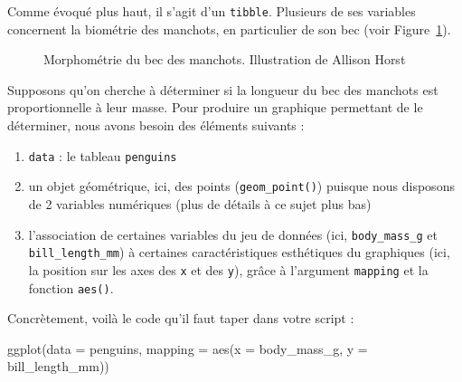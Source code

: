\documentclass[
  a4paper,
  DIV=11,
  numbers=noendperiod,
  oneside]{scrreprt}
\newenvironment{Shaded}{}{}
\newcommand{\AttributeTok}[1]{\textcolor[rgb]{0.84,0.23,0.29}{#1}}
\newcommand{\FunctionTok}[1]{\textcolor[rgb]{0.44,0.26,0.76}{#1}}
\newcommand{\NormalTok}[1]{\textcolor[rgb]{0.14,0.16,0.18}{#1}}
\providecommand{\tightlist}{%
  \setlength{\itemsep}{0pt}\setlength{\parskip}{0pt}}\usepackage{longtable,booktabs,array}
\begin{document}
Comme évoqué plus haut, il s'agit d'un \texttt{tibble}. Plusieurs de ses
variables concernent la biométrie des manchots, en particulier de son
bec (voir Figure~\ref{fig-morpho}).

\begin{figure}


\caption{\label{fig-morpho}Morphométrie du bec des manchots.
Illustration de Allison Horst}

\end{figure}%

Supposons qu'on cherche à déterminer si la longueur du bec des manchots
est proportionnelle à leur masse. Pour produire un graphique permettant
de le déterminer, nous avons besoin des éléments suivants :

\begin{enumerate}
\def\labelenumi{\arabic{enumi}.}
\tightlist
\item
  \texttt{data} : le tableau \texttt{penguins}
\item
  un objet géométrique, ici, des points (\texttt{geom\_point()}) puisque
  nous disposons de 2 variables numériques (plus de détails à ce sujet
  plus bas)
\item
  l'association de certaines variables du jeu de données (ici,
  \texttt{body\_mass\_g} et \texttt{bill\_length\_mm}) à certaines
  caractéristiques esthétiques du graphiques (ici, la position sur les
  axes des \texttt{x} et des \texttt{y}), grâce à l'argument
  \texttt{mapping} et la fonction \texttt{aes()}.
\end{enumerate}

Concrètement, voilà le code qu'il faut taper dans votre script :

\begin{Shaded}
\begin{Highlighting}[]
\FunctionTok{ggplot}\NormalTok{(}\AttributeTok{data =}\NormalTok{ penguins, }\AttributeTok{mapping =} \FunctionTok{aes}\NormalTok{(}\AttributeTok{x =}\NormalTok{ body\_mass\_g, }\AttributeTok{y =}\NormalTok{ bill\_length\_mm))}
\end{Highlighting}
\end{Shaded}
\end{document}
